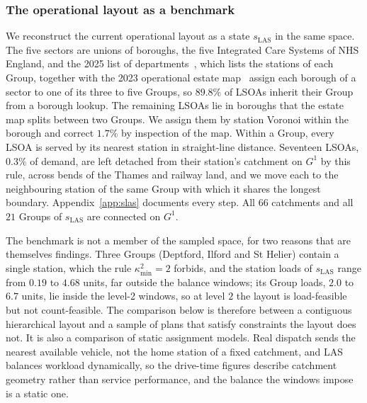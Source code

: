 \documentclass[preprint,12pt,authoryear]{elsarticle}
\theoremstyle{definition}
\begin{document}
\subsubsection{The operational layout as a benchmark}
We reconstruct the current operational layout as a state $s_{\mathrm{LAS}}$ in the same space. The five sectors are unions of boroughs, the five Integrated Care Systems of NHS England, and the 2025 list of departments~\citep{las_departments2025}, which lists the stations of each Group, together with the 2023 operational estate map~\citep{las_estate2023} assign each borough of a sector to one of its three to five Groups, so $89.8\%$ of LSOAs inherit their Group from a borough lookup. The remaining LSOAs lie in boroughs that the estate map splits between two Groups. We assign them by station Voronoi within the borough and correct $1.7\%$ by inspection of the map. Within a Group, every LSOA is served by its nearest station in straight-line distance. Seventeen LSOAs, $0.3\%$ of demand, are left detached from their station's catchment on $G^1$ by this rule, across bends of the Thames and railway land, and we move each to the neighbouring station of the same Group with which it shares the longest boundary. Appendix~\ref{app:slas} documents every step. All $66$ catchments and all $21$ Groups of $s_{\mathrm{LAS}}$ are connected on $G^1$.

The benchmark is not a member of the sampled space, for two reasons that are themselves findings. Three Groups (Deptford, Ilford and St Helier) contain a single station, which the rule $\kappa^2_{\min} = 2$ forbids, and the station loads of $s_{\mathrm{LAS}}$ range from $0.19$ to $4.68$ units, far outside the balance windows; its Group loads, $2.0$ to $6.7$ units, lie inside the level-2 windows, so at level $2$ the layout is load-feasible but not count-feasible. The comparison below is therefore between a contiguous hierarchical layout and a sample of plans that satisfy constraints the layout does not. It is also a comparison of static assignment models. Real dispatch sends the nearest available vehicle, not the home station of a fixed catchment, and LAS balances workload dynamically, so the drive-time figures describe catchment geometry rather than service performance, and the balance the windows impose is a static one.
\end{document}
